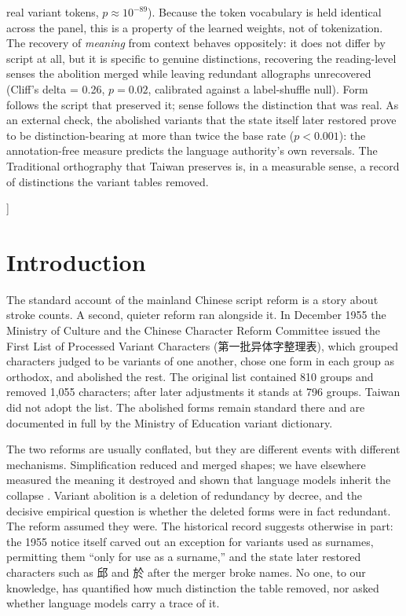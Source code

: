 \documentclass[10pt,twocolumn]{article}
\begin{document}
{\begin{center}
\begin{minipage}{0.86\textwidth}
real variant tokens, $p \approx 10^{-89}$). Because the token vocabulary is held
identical across the panel, this is a property of the learned weights, not of
tokenization. The recovery of \emph{meaning} from context behaves oppositely: it
does not differ by script at all, but it is specific to genuine distinctions,
recovering the reading-level senses the abolition merged while leaving redundant
allographs unrecovered (Cliff's delta = 0.26, $p = 0.02$, calibrated against a
label-shuffle null). Form follows the script that preserved it; sense follows the
distinction that was real. As an external check, the abolished variants that the
state itself later restored prove to be distinction-bearing at more than twice the
base rate ($p < 0.001$): the annotation-free measure predicts the language
authority's own reversals. The Traditional orthography that Taiwan preserves is,
in a measurable sense, a record of distinctions the variant tables removed.
  \end{minipage}
  \end{center}
  \vspace{1.4em}
}]

\section{Introduction}
The standard account of the mainland Chinese script reform is a story about
stroke counts. A second, quieter reform ran alongside it. In December 1955 the
Ministry of Culture and the Chinese Character Reform Committee issued the First
List of Processed Variant Characters (第一批异体字整理表), which grouped
characters judged to be variants of one another, chose one form in each group as
orthodox, and abolished the rest. The original list contained 810 groups and
removed 1,055 characters; after later adjustments it stands at 796 groups. Taiwan
did not adopt the list. The abolished forms remain standard there and are
documented in full by the Ministry of Education variant dictionary.

The two reforms are usually conflated, but they are different events with
different mechanisms. Simplification reduced and merged shapes; we have elsewhere
measured the meaning it destroyed and shown that language models inherit the
collapse \cite{maity2025simplification}. Variant abolition is a deletion of
redundancy by decree, and the decisive empirical question is whether the deleted
forms were in fact redundant. The reform assumed they were. The historical record
suggests otherwise in part: the 1955 notice itself carved out an exception for
variants used as surnames, permitting them ``only for use as a surname,'' and the
state later restored characters such as 邱 and 於 after the merger broke names. No
one, to our knowledge, has quantified how much distinction the table removed, nor
asked whether language models carry a trace of it.
\end{document}
